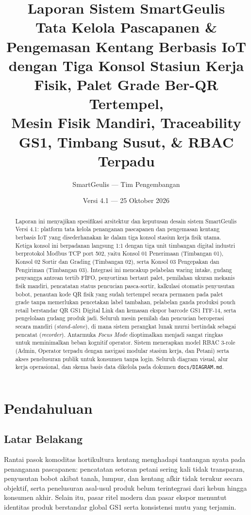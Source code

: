 \documentclass[12pt,a4paper]{article}
\title{%
  \textbf{Laporan Sistem SmartGeulis}\\[6pt]
  \large Tata Kelola Pascapanen \& Pengemasan Kentang Berbasis IoT\\ dengan Tiga Konsol Stasiun Kerja Fisik, Palet Grade Ber-QR Tertempel,\\ Mesin Fisik Mandiri, Traceability GS1, Timbang Susut, \& RBAC Terpadu%
}
\author{SmartGeulis --- Tim Pengembangan}
\date{Versi 4.1 --- 25 Oktober 2026}
\begin{document}
\maketitle

\begin{abstract}
\noindent
Laporan ini menyajikan spesifikasi arsitektur dan keputusan desain sistem SmartGeulis Versi 4.1: platform tata kelola penanganan pascapanen dan pengemasan kentang berbasis IoT yang disederhanakan ke dalam tiga konsol stasiun kerja fisik utama. Ketiga konsol ini berpadanan langsung 1:1 dengan tiga unit timbangan digital industri berprotokol Modbus TCP port 502, yaitu Konsol 01 Penerimaan (Timbangan 01), Konsol 02 Sortir dan Grading (Timbangan 02), serta Konsol 03 Pengepakan dan Pengiriman (Timbangan 03). Integrasi ini mencakup pelabelan waring intake, gudang penyangga antrean tertib FIFO, penyortiran bertaut palet, pemilahan ukuran mekanis fisik mandiri, pencatatan status pencucian pasca-sortir, kalkulasi otomatis penyusutan bobot, penautan kode QR fisik yang sudah tertempel secara permanen pada palet grade tanpa memerlukan pencetakan label tambahan, pelabelan ganda produksi pouch retail berstandar QR GS1 Digital Link dan kemasan ekspor barcode GS1 ITF-14, serta pengelolaan gudang produk jadi. Seluruh mesin pemilah dan pencucian beroperasi secara mandiri (\emph{stand-alone}), di mana sistem perangkat lunak murni bertindak sebagai pencatat (\emph{recorder}). Antarmuka \emph{Focus Mode} dioptimalkan menjadi sangat ringkas untuk meminimalkan beban kognitif operator. Sistem menerapkan model RBAC 3-role (Admin, Operator terpadu dengan navigasi modular stasiun kerja, dan Petani) serta akses penelusuran publik untuk konsumen tanpa login. Seluruh diagram visual, alur kerja operasional, dan skema basis data dikelola pada dokumen \texttt{docs/DIAGRAM.md}.
\end{abstract}

\tableofcontents
\newpage

\section{Pendahuluan}

\subsection{Latar Belakang}
Rantai pasok komoditas hortikultura kentang menghadapi tantangan nyata pada penanganan pascapanen: pencatatan setoran petani sering kali tidak transparan, penyusutan bobot akibat tanah, lumpur, dan kentang afkir tidak terukur secara objektif, serta penelusuran asal-usul produk belum terintegrasi dari kebun hingga konsumen akhir. Selain itu, pasar ritel modern dan pasar ekspor menuntut identitas produk berstandar global GS1 serta konsistensi mutu yang terjamin.
\end{document}
